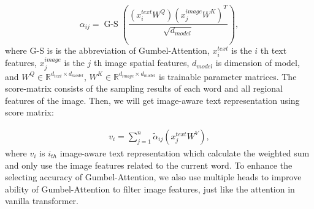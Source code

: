\documentclass[11pt]{article}
\begin{document}
\begin{table*}[tp]

  \centering
  \begin{threeparttable}
    \end{threeparttable}
    \caption{Experimental results on the Multi30k test set. Best results are highlighted in bold.}
\end{table*}


\begin{equation}
\alpha_{i j}=\operatorname{G-S}\left(\frac{\left(x_{i}^{{text}} W^{Q}\right)\left(x_{j}^{{image}} W^{K}\right)^{T}}{\sqrt{d_{{model}}}}\right),
\end{equation}
where G-S is is the abbreviation of Gumbel-Attention, $x_{i}^{{text}}$ is the $i$ th text features, $x_{j}^{{image}}$ is the $j$ th image spatial features, $d_{{model}}$ is dimension of model, and $W^{Q} \in \mathbb{R}^{ d_{{text}} \times d_{{model}}}$, $W^{K} \in \mathbb{R}^{ d_{{image}} \times d_{{model}}}$ is trainable parameter matrices. The score-matrix consists of the sampling results of each word and all regional features of the image. Then, we will get image-aware text representation using score matrix:

\begin{equation}
\begin{aligned}
v_{i}=\sum_{j=1}^{n} \tilde{\alpha}_{i j}\left(x_{j}^{{text}} W^{V}\right),
\end{aligned}
\end{equation}
where $v_{i}$ is $i_{{th}}$ image-aware text representation which calculate the weighted sum and only use the image features related to the current word. 
To enhance the selecting accuracy of Gumbel-Attention, we also use multiple heads to improve ability of Gumbel-Attention to filter image features, just like the attention in vanilla transformer.
\end{document}
